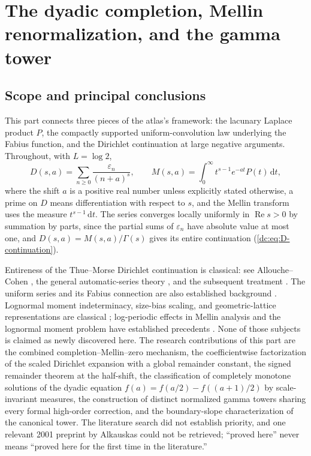 \documentclass[11pt,a4paper,oneside,openany]{book}
\numberwithin{equation}{chapter}
\theoremstyle{definition}
\theoremstyle{remark}
\newcommand{\eps}{\varepsilon}
\newcommand{\dd}{\,\mathrm d}
\DeclareMathOperator{\Rea}{Re}
\begin{document}

\part{The dyadic completion, Mellin renormalization, and the gamma tower}
\label{part:completion}

\chapter{Scope and principal conclusions}
\label{dc:sec:scope}
This part connects three pieces of the atlas's framework: the lacunary
Laplace product $P$, the compactly supported uniform-convolution law
underlying the Fabius function, and the Dirichlet continuation at large
negative arguments. Throughout, with $L=\log2$,
\begin{equation}\label{dc:eq:notation}
 D(s,a)=\sum_{n\ge0}\frac{\eps_n}{(n+a)^s},\qquad
 M(s,a)=\int_0^\infty t^{s-1}e^{-at}P(t)\dd t,
\end{equation}
where the shift $a$ is a positive real number unless explicitly stated
otherwise, a prime on $D$ means differentiation with respect to $s$, and
the Mellin transform uses the measure $t^{s-1}\dd t$. The series converges
locally uniformly in $\Rea s>0$ by summation by parts, since the partial
sums of $\eps_n$ have absolute value at most one, and $D(s,a)=M(s,a)/\Gamma(s)$
gives its entire continuation (\cref{dc:eq:D-continuation}).

Entireness of the Thue--Morse Dirichlet continuation is classical: see
Allouche--Cohen \cite{allouche-cohen}, the general automatic-series theory
\cite{amp}, and the subsequent treatment \cite{toth}. The uniform series
and its Fabius connection are also established background
\cite{arias2018,haugland,atlas}. Lognormal moment indeterminacy, size-bias
scaling, and geometric-lattice representations are classical \cite{agk};
log-periodic effects in Mellin analysis and the lognormal moment problem
have established precedents \cite{fgd,heyde}. None of those subjects is
claimed as newly discovered here. The research contributions of this part
are the combined completion--Mellin--zero mechanism, the coefficientwise
factorization of the scaled Dirichlet expansion with a global remainder
constant, the signed remainder theorem at the half-shift, the
classification of completely monotone solutions of the dyadic equation
$f(a)=f(a/2)-f((a+1)/2)$ by scale-invariant measures, the construction of
distinct normalized gamma towers sharing every formal high-order correction,
and the boundary-slope characterization of the canonical tower. The
literature search did not establish priority, and one relevant 2001 preprint
by Alkauskas \cite{alkauskas} could not be retrieved; ``proved here'' never
means ``proved here for the first time in the literature.''
\end{document}
